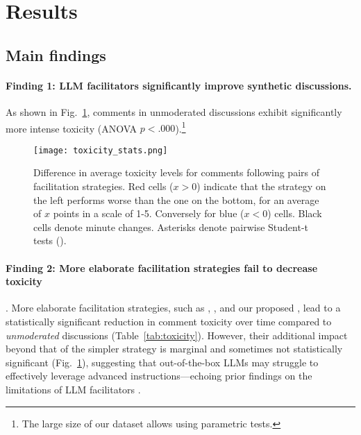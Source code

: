 %

\section{Results}
\label{sec:results}


\subsection{Main findings}
\label{ssec:results:main}

\paragraph{Finding 1: \ac{LLM} facilitators significantly improve synthetic discussions.} As shown in Fig.~\ref{fig:toxicity_stats}, comments in unmoderated discussions exhibit significantly more intense toxicity (ANOVA $p<.000$).\footnote{The large size of our dataset allows using parametric tests.} 

\begin{figure}
	\texttt{[image: toxicity\_stats.png]}
	\centering
	\caption{Difference in average toxicity levels for comments following pairs of facilitation strategies. Red cells ($x>0$) indicate that the strategy on the left performs worse than the one on the bottom, for an average of $x$ points in a scale of 1-5. Conversely for blue ($x<0$) cells. Black cells denote minute changes. Asterisks denote pairwise Student-t tests (\asterisknote).}
	\label{fig:toxicity_stats}
\end{figure}

\paragraph{Finding 2: More elaborate facilitation strategies fail to decrease toxicity}.
More elaborate facilitation strategies, such as \emph{\strategyregroom}, \emph{\strategyconstrcomm}, and our proposed \emph{\strategymodgame}, lead to a statistically significant reduction in comment toxicity over time compared to \emph{unmoderated} discussions (Table~\ref{tab:toxicity}). However, their additional impact beyond that of the simpler \emph{\strategynoinstr} strategy is marginal and sometimes not statistically significant (Fig.~\ref{fig:toxicity_stats}), suggesting that out-of-the-box \acp{LLM} may struggle to effectively leverage advanced instructions---echoing prior findings on the limitations of \ac{LLM} facilitators \cite{cho-etal-2024-language}.



